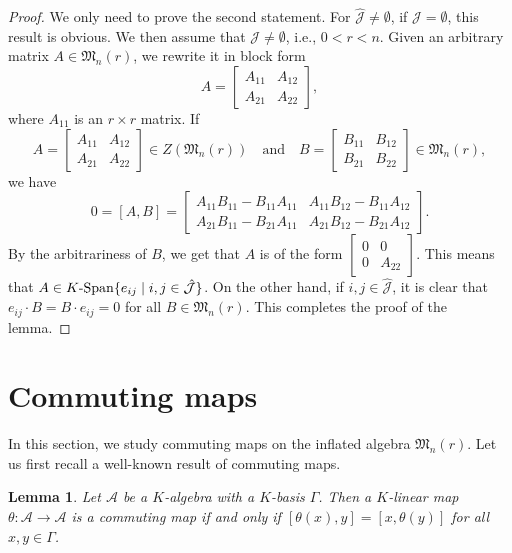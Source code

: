 \documentclass[reqno]{amsart}
\theoremstyle{plain}
\newtheorem{lemma}[theorem]{Lemma}
\theoremstyle{definition}
\begin{document}
\begin{proof}
We only need to prove the second statement.
For $\hat{\mathcal{J}} \neq \emptyset$, if $\mathcal{J} = \emptyset$, this result is obvious.
We then assume that $\mathcal{J} \neq \emptyset$, i.e.,
$0<r<n$. 
Given an arbitrary matrix $A\in \mathfrak{M}_n(r)$, we rewrite
it in block form
\[
A = \begin{bmatrix} A_{11} & A_{12} \\ A_{21} & A_{22} \end{bmatrix},
\]
where $A_{11}$ is an $r\times r$ matrix.
If
\[
A = \begin{bmatrix} A_{11} & A_{12} \\ A_{21} & A_{22} \end{bmatrix} \in Z(\mathfrak{M}_n(r)) \quad \text{and} \quad B = \begin{bmatrix} B_{11} & B_{12} \\ B_{21} & B_{22} \end{bmatrix} \in \mathfrak{M}_n(r),
\]
we have 
\[
0 = [A, B] = \begin{bmatrix} 
A_{11}B_{11} - B_{11}A_{11} & A_{11}B_{12} - B_{11}A_{12} \\
A_{21}B_{11} - B_{21}A_{11} & A_{21}B_{12} - B_{21}A_{12} 
\end{bmatrix}.
\]
By the arbitrariness of $B$, we get that $A$ is of the form
$ \begin{bmatrix} 0 & 0 \\ 0 & A_{22} \end{bmatrix}$. This means that $A\in K\text{-}{\rm Span} \{ e_{ij} \mid i, j \in \hat{\mathcal{J}} \}$.
On the other hand, if $i,j\in \hat{\mathcal{J}}$, it is clear
that $e_{ij}\cdot B=B\cdot e_{ij}=0$ for all $B\in \mathfrak{M}_n(r)$. This
completes the proof of the lemma.
\end{proof}



\section{Commuting maps}\label{xxsec3}

In this section, we study commuting maps on the
inflated algebra $\mathfrak{M}_n(r)$. Let us first recall
a well-known result of commuting maps.
 
\begin{lemma}\label{l21}
Let $\mathcal{A}$ be a $K$-algebra with a $K$-basis $\Gamma$. Then a $K$-linear map $\theta: \mathcal{A} \to \mathcal{A}$ is a commuting map if and only if $[\theta(x), y] = [x, \theta(y)]$ for all $x, y\in \Gamma$.
\end{lemma}
\end{document}
